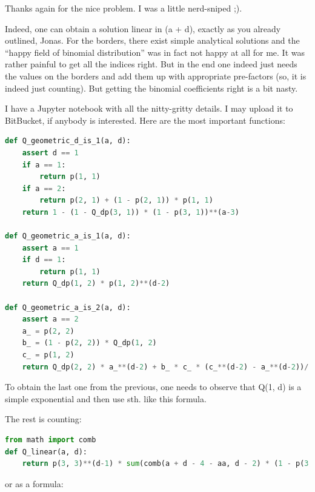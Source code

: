 \documentclass[11pt,a4paper]{article}
\begin{document}
    \begin{mdframed}[leftline=true,rightline=false,topline=false,bottomline=false,linewidth=1pt,linecolor=gray,innerleftmargin=20pt,innerrightmargin=5pt,innertopmargin=0pt,innerbottommargin=0pt,leftmargin=20pt]
    Thanks again for the nice problem.
    I was a little nerd-sniped ;).

    Indeed, one can obtain a solution linear in (a + d), exactly as you already outlined, Jonas.
    For the borders, there exist simple analytical solutions and the ``happy field of binomial distribution'' was in fact not happy at all for me.
    It was rather painful to get all the indices right.
    But in the end one indeed just needs the values on the borders and add them up with appropriate pre-factors (so, it is indeed just counting).
    But getting the binomial coefficients right is a bit nasty.

    I have a Jupyter notebook with all the nitty-gritty details.
    I may upload it to BitBucket, if anybody is interested.
    Here are the most important functions: \\

    \begin{lstlisting}[language=Python]
def Q_geometric_d_is_1(a, d):
    assert d == 1
    if a == 1:
        return p(1, 1)
    if a == 2:
        return p(2, 1) + (1 - p(2, 1)) * p(1, 1)
    return 1 - (1 - Q_dp(3, 1)) * (1 - p(3, 1))**(a-3)

def Q_geometric_a_is_1(a, d):
    assert a == 1
    if d == 1:
        return p(1, 1)
    return Q_dp(1, 2) * p(1, 2)**(d-2)

def Q_geometric_a_is_2(a, d):
    assert a == 2
    a_ = p(2, 2)
    b_ = (1 - p(2, 2)) * Q_dp(1, 2)
    c_ = p(1, 2)
    return Q_dp(2, 2) * a_**(d-2) + b_ * c_ * (c_**(d-2) - a_**(d-2))/(c_ - a_)
    \end{lstlisting}

    To obtain the last one from the previous, one needs to observe that Q(1, d) is a simple exponential and then use sth. like this formula.

    The rest is counting:

    \begin{lstlisting}[language=Python]
from math import comb
def Q_linear(a, d):
    return p(3, 3)**(d-1) * sum(comb(a + d - 4 - aa, d - 2) * (1 - p(3, 3))**(a - 2 - aa) * Q_geometric_d_is_1(aa+2, 1) for aa in range(a-2))
    \end{lstlisting}

    or as a formula:


\end{mdframed}
\end{document}
